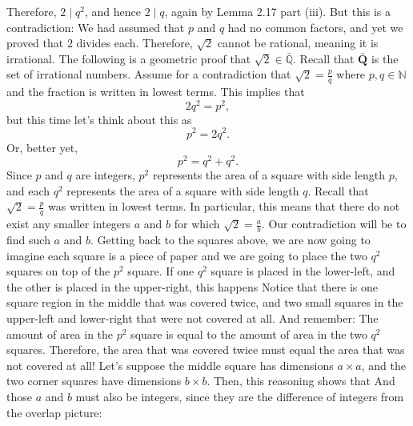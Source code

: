 \documentclass{report}
\begin{document}
\begin{itemize}
            Therefore, $2 \mid q^2$, and hence $2 \mid q$, again by Lemma 2.17 part (iii). But this is a contradiction: We had assumed that $p$ and $q$ had no common factors, and yet we proved that $2$ divides each. Therefore, $\sqrt{2}$ cannot be rational, meaning it is irrational.
            \bigbreak \noindent 
            The following is a geometric proof that $\sqrt{2} \in \bar{\mathbb{Q}}$. Recall that $\bar{\mathbf{Q}}$ is the set of irrational numbers.
            \bigbreak \noindent 
            Assume for a contradiction that $\sqrt{2} = \frac{p}{q}$ where $p, q \in \mathbb{N}$ and the fraction is written in lowest terms. This implies that 
            \[
                2q^2 = p^2,
            \]
            but this time let’s think about this as 
            \[
                p^2 = 2q^2.
            \]
            Or, better yet,
            \[
                p^2 = q^2 + q^2.
            \]
            Since $p$ and $q$ are integers, $p^2$ represents the area of a square with side length $p$, and each $q^2$ represents the area of a square with side length $q$.
            \bigbreak \noindent 
            \bigbreak \noindent 
            Recall that $\sqrt{2} = \frac{p}{q}$ was written in lowest terms. In particular, this means that there do not exist any smaller integers $a$ and $b$ for which $\sqrt{2} = \frac{a}{b}$. Our contradiction will be to find such $a$ and $b$.
            \bigbreak \noindent 
            Getting back to the squares above, we are now going to imagine each square is a piece of paper and we are going to place the two $q^{2}$ squares on top of the $p^{2}$ square. If one $q^{2}$ square is placed in the lower-left, and the other is placed in the upper-right, this happens
            \bigbreak \noindent 
            \bigbreak \noindent 
            Notice that there is one square region in the middle that was covered twice, and two small squares in the upper-left and lower-right that were not covered at all. And remember: The amount of area in the $p^2$ square is equal to the amount of area in the two $q^2$ squares. Therefore, the area that was covered twice must equal the area that was not covered at all! Let’s suppose the middle square has dimensions $a \times a$, and the two corner squares have dimensions $b \times b$. Then, this reasoning shows that
            \bigbreak \noindent 
            \bigbreak \noindent 
            And those $a$ and $b$ must also be integers, since they are the difference of integers from the overlap picture:

\end{itemize}
\end{document}
